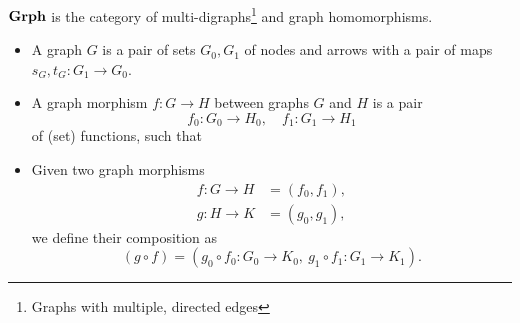 \documentclass{scrartcl}
\newenvironment{category}{\begin{itemize}[leftmargin=.9in]}{\end{itemize}}
\newcommand{\catobj}[1]{\item[\textbf{Objects}] #1}
\newcommand{\catarr}[1]{\item[\textbf{Arrows}] #1}
\newcommand{\catcomp}[1]{\item[\textbf{Comp.}] #1}
\newenvironment{diags}[1][0pt]{\begin{center}\vspace{#1}%
    \def\diagsspaceafter{#1}}{%
    \vspace{\diagsspaceafter}\end{center}}
\begin{document}
\begin{example}
  $\boldsymbol{\mathbf{Grph}}$ is the category of multi-digraphs\footnote{Graphs with
    multiple, directed edges} and graph homomorphisms.

  \begin{category}
    \catobj{A graph $G$ is a pair of sets $G_0, G_1$ of nodes and
      arrows with a pair of maps $s_G, t_G \colon G_1 \to G_0$.}

    \catarr{A graph morphism $f \colon G \to H$ between graphs $G$ and
      $H$ is a pair
      \[
      f_0 \colon G_0 \to H_0, \quad f_1 \colon G_1 \to H_1
      \]
      of (set) functions, such that}
    \begin{diags}
      \hspace{2em}
    \end{diags}

    \catcomp{Given two graph morphisms
      \begin{align*}
        f \colon G \to H &= (f_0, f_1),\\
        g \colon H \to K &= (g_0, g_1),
      \end{align*}
      we define their composition as
      \[
      (g \circ f) = (g_0 \circ f_0 : G_0 \to K_0,\ g_1 \circ f_1 : G_1
      \to K_1).
      \]
    }


\end{category}
\end{example}
\end{document}
